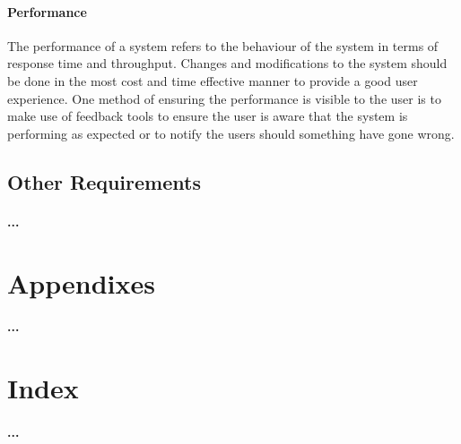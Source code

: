 \documentclass[runningheads,a4paper]{llncs}
\begin{document}
 
 \paragraph{\textbf{Performance} \\}
The performance of a system refers to the behaviour of the system in
terms of response time and throughput. Changes and modifications to
the system should be done in the most cost and time effective manner to
provide a good user experience. One method of ensuring the performance
is visible to the user is to make use of feedback tools to ensure the user
is aware that the system is performing as expected or to notify the users
should something have gone wrong.



\subsection{Other Requirements}
\paragraph{...}

\section{Appendixes}
\paragraph{...}

\section{Index}
\paragraph{...}
\end{document}
